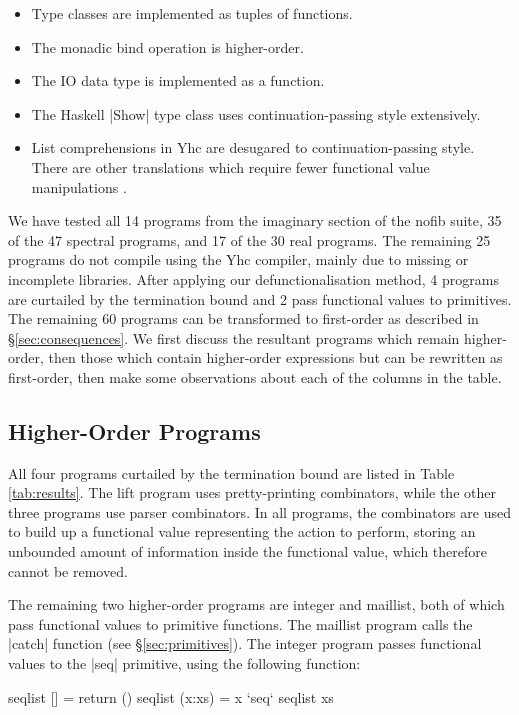 \documentclass{sigplanconf}
\begin{document}
\begin{itemize}
\item Type classes are implemented as tuples of functions.
\item The monadic bind operation is higher-order.
\item The IO data type is implemented as a function.
\item The Haskell |Show| type class uses continuation-passing style extensively.
\item List comprehensions in Yhc are desugared to continuation-passing style. There are other translations which require fewer functional value manipulations \cite{coutts:stream_fusion}.
\end{itemize}

We have tested all 14 programs from the imaginary section of the nofib suite, 35 of the 47 spectral programs, and 17 of the 30 real programs. The remaining 25 programs do not compile using the Yhc compiler, mainly due to missing or incomplete libraries. After applying our defunctionalisation method, 4 programs are curtailed by the termination bound and 2 pass functional values to primitives. The remaining 60 programs can be transformed to first-order as described in \S\ref{sec:consequences}. We first discuss the resultant programs which remain higher-order, then those which contain higher-order expressions but can be rewritten as first-order, then make some observations about each of the columns in the table.

\subsection{Higher-Order Programs}

All four programs curtailed by the termination bound are listed in Table \ref{tab:results}. The lift program uses pretty-printing combinators, while the other three programs use parser combinators. In all programs, the combinators are used to build up a functional value representing the action to perform, storing an unbounded amount of information inside the functional value, which therefore cannot be removed.

The remaining two higher-order programs are integer and maillist, both of which pass functional values to primitive functions. The maillist program calls the |catch| function (see \S\ref{sec:primitives}). The integer program passes functional values to the |seq| primitive, using the following function:

\begin{code}
seqlist []      = return ()
seqlist (x:xs)  = x `seq` seqlist xs
\end{code}
\end{document}
